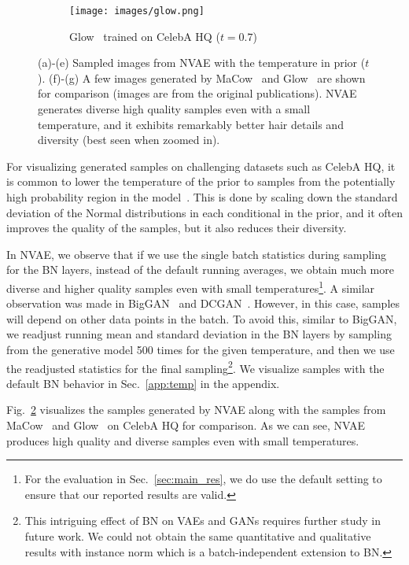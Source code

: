 \documentclass{article}
\begin{document}
\begin{figure}[t]
\begin{subfigure}[b]{.49\textwidth}
\centering
    \setlength{\belowcaptionskip}{1pt}
    \texttt{[image: images/glow.png]}
    \caption{Glow~\cite{kingma2018glow} trained on CelebA HQ ($t = 0.7$)}
    \label{fig:glow}
\end{subfigure}
\caption{(a)-(e) Sampled images from NVAE with the temperature in prior ($t$). (f)-(g) A few images generated by MaCow~\cite{ma19MaCow} and Glow~\cite{kingma2018glow} are shown for comparison (images are from the original publications). NVAE generates diverse high quality samples even with a small temperature, and it exhibits remarkably better hair details and diversity (best seen when zoomed in).}
\label{fig:main_qual}
\end{figure} 
For visualizing generated samples on challenging datasets such as CelebA HQ, it is common to lower the temperature of the prior to samples from the potentially high probability region in the model~\cite{kingma2018glow}. This is done by scaling down the standard deviation of the Normal distributions in each conditional in the prior, and it often improves the quality of the samples, but it also reduces their diversity.

In NVAE, we observe that if we use the single batch statistics during sampling for the BN layers, instead of the default running averages, we obtain much more diverse and higher quality samples even with small temperatures\footnote{For the evaluation in Sec.~\ref{sec:main_res}, we do use the default setting to ensure that our reported results are valid.}. A similar observation was made in BigGAN~\cite{brock2018biggan} and DCGAN~\cite{radford2015dcgan}. However, in this case, samples will depend on other data points in the batch. To avoid this, similar to BigGAN, we readjust running mean and standard deviation in the BN layers by sampling from the generative model 500 times for the given temperature, and then we use the readjusted statistics for the final sampling\footnote{This intriguing effect of BN on VAEs and GANs requires further study in future work. We could not obtain the same quantitative and qualitative results with instance norm which is a batch-independent extension to BN.}. We visualize samples with the default BN behavior in Sec.~\ref{app:temp} in the appendix.

Fig.~\ref{fig:main_qual} visualizes the samples generated by NVAE along with the samples from MaCow~\cite{ma19MaCow} and Glow~\cite{kingma2018glow} on CelebA HQ for comparison. As we can see, NVAE produces high quality and diverse samples even with small temperatures. 
\end{document}
